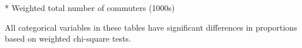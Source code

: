 \documentclass[10 pt,letterpaper]{article}
\begin{document}
\begin{table}[H]
{\begin{tabular}{lrrrrlrrrr}
			\\ \hline   
		\end{tabular}
		
		
	}
	
	\label{tab:summary_p1}
	
	\vspace{1mm}
	
	\footnotesize
	
	* Weighted total number of commuters (1000s)
	
	\vspace{1mm}
	
	All categorical variables in these tables have significant differences in proportions based on weighted chi-square tests. 
	
	\normalsize 
	
	
\end{table}
\end{document}
